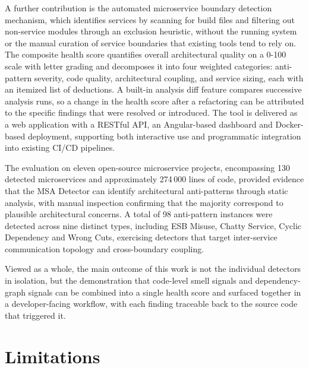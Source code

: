 \par A further contribution is the automated microservice boundary detection mechanism, which identifies services by scanning for build files and filtering out non-service modules through an exclusion heuristic, without the running system or the manual curation of service boundaries that existing tools tend to rely on. The composite health score quantifies overall architectural quality on a 0-100 scale with letter grading and decomposes it into four weighted categories: anti-pattern severity, code quality, architectural coupling, and service sizing, each with an itemized list of deductions. A built-in analysis diff feature compares successive analysis runs, so a change in the health score after a refactoring can be attributed to the specific findings that were resolved or introduced. The tool is delivered as a web application with a RESTful API, an Angular-based dashboard and Docker-based deployment, supporting both interactive use and programmatic integration into existing CI/CD pipelines.

\par The evaluation on eleven open-source microservice projects, encompassing 130 detected microservices and approximately 274\,000 lines of code, provided evidence that the MSA Detector can identify architectural anti-patterns through static analysis, with manual inspection confirming that the majority correspond to plausible architectural concerns. A total of 98 anti-pattern instances were detected across nine distinct types, including ESB Misuse, Chatty Service, Cyclic Dependency and Wrong Cuts, exercising detectors that target inter-service communication topology and cross-boundary coupling.

\par Viewed as a whole, the main outcome of this work is not the individual detectors in isolation, but the demonstration that code-level smell signals and dependency-graph signals can be combined into a single health score and surfaced together in a developer-facing workflow, with each finding traceable back to the source code that triggered it.

\section{Limitations}
\label{sec:limitations}

